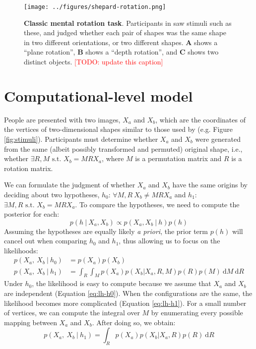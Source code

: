 \documentclass{article} %
\newcommand{\TODO}[1]{\textcolor{red}{[TODO: #1]}}
\begin{document}
\begin{figure}[t]
  \centering
  \texttt{[image: ../figures/shepard-rotation.png]}
  \caption{\textbf{Classic mental rotation task}. Participants in
    \cite{Shepard1971} saw stimuli such as these, and judged whether
    each pair of shapes was the same shape in two different
    orientations, or two different shapes. \textbf{A} shows a ``plane
    rotation'', \textbf{B} shows a ``depth rotation'', and \textbf{C}
    shows two distinct objects. \TODO{update this caption}}
  \label{fig:mental-rotation}
\end{figure}

\section{Computational-level model}

People are presented with two images, $X_a$ and $X_b$, which are the
coordinates of the vertices of two-dimensional shapes similar to those
used by \cite{Cooper:1975wp} (e.g. Figure
\ref{fig:stimuli}). Participants must determine whether $X_a$ and
$X_b$ were generated from the same (albeit possibly transformed and
permuted) original shape, i.e., whether $\exists R,M\textrm{ s.t. }
X_b=MRX_a$, where $M$ is a permutation matrix and $R$ is a rotation
matrix.

We can formulate the judgment of whether $X_a$ and $X_b$ have the same
origins by deciding about two hypotheses, $h_0$: $\forall M,R\ X_b\neq
MRX_a$ and $h_1$: $\exists M,R\textrm{ s.t. } X_b=MRX_a$.  To compare
the hypotheses, we need to compute the posterior for each:
\begin{equation}
p(h\ \vert\ X_a, X_b)\propto p(X_a, X_b\ \vert\ h)p(h)
\end{equation}
Assuming the hypotheses are equally likely \textit{a priori}, the
prior term $p(h)$ will cancel out when comparing $h_0$ and $h_1$, thus
allowing us to focus on the likelihoods:
\begin{align}
  p(X_a,\ X_b\ \vert \ h_0)&=p(X_a)p(X_b) \label{eq:lh-h0}\\
  p(X_a,\ X_b\ \vert \ h_1)&=\int_R\int_M p(X_a) p(X_b\vert X_a,R,M) p(R) p(M)\ \mathrm{d}M\ \mathrm{d}R \label{eq:lh-h1}
\end{align}
Under $h_0$, the likelihood is easy to compute because we assume that
$X_a$ and $X_b$ are independent (Equation \ref{eq:lh-h0}). When the
configurations are the same, the likelihood becomes more complicated
(Equation \ref{eq:lh-h1}). For a small number of vertices, we can
compute the integral over $M$ by enumerating every possible mapping
between $X_a$ and $X_b$. After doing so, we obtain:
\begin{equation} 
  p(X_a,\ X_b\ \vert \ h_1)=\int_R p(X_a) p(X_b\vert X_a,R) p(R)\ \mathrm{d}R
\end{equation}
\end{document}
